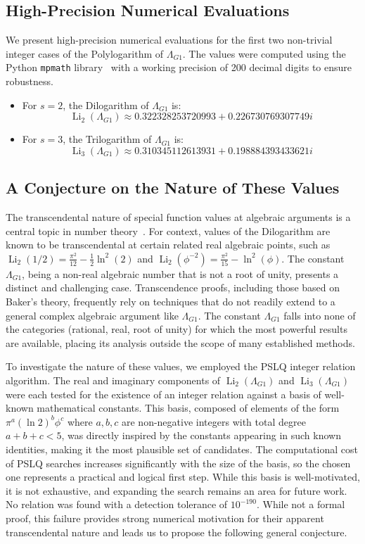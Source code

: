 \documentclass{amsart}
\theoremstyle{plain}
\theoremstyle{definition}
\theoremstyle{remark}
\DeclareMathOperator{\Li}{Li}
\newcommand{\LambdaG}{\Lambda_{G1}}
\newcommand{\phiG}{\phi}
\begin{document}
\subsection{High-Precision Numerical Evaluations}
We present high-precision numerical evaluations for the first two non-trivial integer cases of the Polylogarithm of $\LambdaG$. The values were computed using the Python \texttt{mpmath} library~\cite{mpmath} with a working precision of 200 decimal digits to ensure robustness.
\begin{itemize}
    \item For $s=2$, the Dilogarithm of $\LambdaG$ is:
    \[ \Li_2(\LambdaG) \approx 0.322328253720993 + 0.226730769307749i \]
    
    \item For $s=3$, the Trilogarithm of $\LambdaG$ is:
    \[ \Li_3(\LambdaG) \approx 0.310345112613931 + 0.198884393433621i \]
\end{itemize}

\subsection{A Conjecture on the Nature of These Values}
The transcendental nature of special function values at algebraic arguments is a central topic in number theory~\cite{Baker}. For context, values of the Dilogarithm are known to be transcendental at certain related real algebraic points, such as $\Li_2(1/2) = \frac{\pi^2}{12} - \frac{1}{2}\ln^2(2)$ and $\Li_2(\phiG^{-2}) = \frac{\pi^2}{15} - \ln^2(\phiG)$. The constant $\LambdaG$, being a non-real algebraic number that is not a root of unity, presents a distinct and challenging case. Transcendence proofs, including those based on Baker's theory, frequently rely on techniques that do not readily extend to a general complex algebraic argument like $\LambdaG$. The constant $\LambdaG$ falls into none of the categories (rational, real, root of unity) for which the most powerful results are available, placing its analysis outside the scope of many established methods.

To investigate the nature of these values, we employed the PSLQ integer relation algorithm. The real and imaginary components of $\Li_2(\LambdaG)$ and $\Li_3(\LambdaG)$ were each tested for the existence of an integer relation against a basis of well-known mathematical constants. This basis, composed of elements of the form $\pi^a (\ln 2)^b \phiG^c$ where $a,b,c$ are non-negative integers with total degree $a+b+c < 5$, was directly inspired by the constants appearing in such known identities, making it the most plausible set of candidates. The computational cost of PSLQ searches increases significantly with the size of the basis, so the chosen one represents a practical and logical first step. While this basis is well-motivated, it is not exhaustive, and expanding the search remains an area for future work. No relation was found with a detection tolerance of $10^{-190}$. While not a formal proof, this failure provides strong numerical motivation for their apparent transcendental nature and leads us to propose the following general conjecture.
\end{document}
